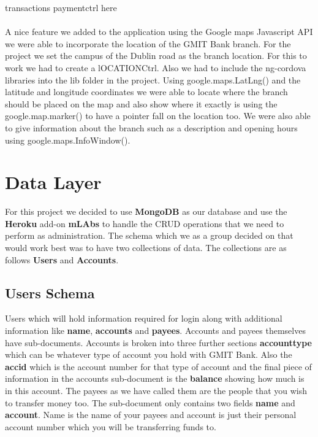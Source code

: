 transactions paymentctrl here\paragraph{}

A nice feature we added to the application using the Google maps Javascript API we were able to incorporate the location of the GMIT Bank branch. For the project we set the campus of the Dublin road as the branch location. For this to work we had to create a lOCATIONCtrl. Also we had to include the ng-cordova libraries into the lib folder in the project. Using google.maps.LatLng() and the latitude and longitude coordinates we were able to locate where the branch should be placed on the map and also show where it exactly is using the google.map.marker() to have a pointer fall on the location too. We were also able to give information about the branch such as a description and opening hours using google.maps.InfoWindow().\cite{map}

\section{Data Layer}
For this project we decided to use \textbf{MongoDB} as our database and use the \textbf{Heroku} add-on \textbf{mLAbs} to handle the CRUD operations that we need to perform as administration. The schema which we as a group decided on that would work best was to have two collections of data. The collections are as follows \textbf{Users} and \textbf{Accounts}.\paragraph{}

\subsection{Users Schema}
 Users which will hold information required for login along with additional information like \textbf{name}, \textbf{accounts} and \textbf{payees}. Accounts and payees themselves have sub-documents. Accounts is broken into three further sections \textbf{accounttype} which can be whatever type of account you hold with GMIT Bank. Also the \textbf{accid} which is the account number for that type of account and the final piece of information in the accounts sub-document is the \textbf{balance} showing how much is in this account. The payees as we have called them are the people that you wish to transfer money too. The sub-document only contains two fields \textbf{name} and \textbf{account}. Name is the name of your payees and account is just their personal account number which you will be transferring funds to. \paragraph{}

